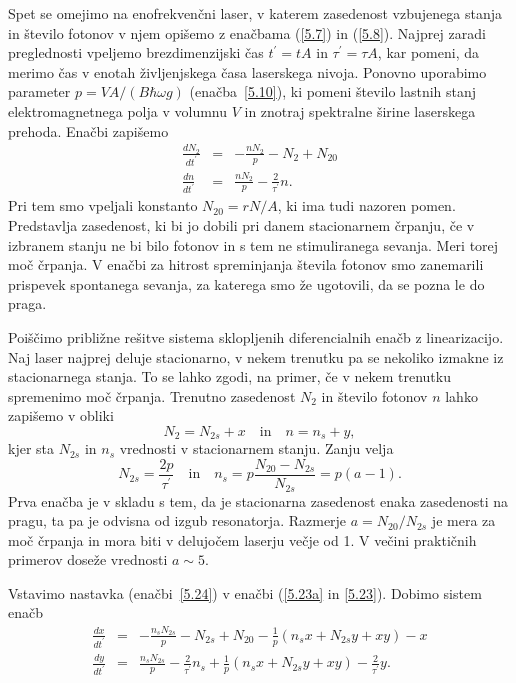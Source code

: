 Spet se omejimo na enofrekvenčni laser, v katerem zasedenost vzbujenega stanja
in število fotonov v njem opišemo z enačbama (\ref{5.7})
in (\ref{5.8}). Najprej zaradi preglednosti vpeljemo
brezdimenzijski čas $t^{\prime}=t A$ in $\tau^{\prime}=\tau A$, kar pomeni, da merimo 
čas v enotah življenjskega časa laserskega nivoja. Ponovno uporabimo parameter
$p=VA/(B\hbar\omega g)$ (enačba~\ref{5.10}), ki pomeni število lastnih stanj 
elektromagnetnega polja v volumnu $V$ in znotraj spektralne širine laserskega prehoda. 
Enačbi zapišemo 
\begin{eqnarray}  
\frac{d N_2}{d t^{\prime}}&=&-\frac{nN_2}{p}-N_2+N_{20} \label{5.23a} \\
\frac{d n}{d t^{\prime}}& = & \frac{nN_2}{p}-\frac{2}{\tau^{\prime}}n.
\label{5.23}
\end{eqnarray}
Pri tem smo vpeljali konstanto $N_{20}= rN/A$, ki ima tudi nazoren pomen.
Predstavlja zasedenost, ki bi jo dobili pri danem stacionarnem črpanju, če v
izbranem stanju ne bi bilo fotonov in s tem ne stimuliranega sevanja. Meri torej 
moč črpanja. V enačbi za hitrost spreminjanja števila fotonov
smo zanemarili prispevek spontanega sevanja, za katerega smo že ugotovili,
da se pozna le do praga.

Poiščimo približne rešitve sistema sklopljenih diferencialnih enačb z 
linearizacijo. Naj laser najprej deluje stacionarno, v nekem trenutku pa se 
nekoliko izmakne iz stacionarnega stanja. To se lahko zgodi, na primer, če v nekem 
trenutku spremenimo moč črpanja. Trenutno zasedenost $N_2$ in število fotonov $n$
lahko zapišemo v obliki 
\begin{equation}  
N_2= N_{2s}+x \quad \mathrm{in} \quad n=n_s+y,
\label{5.24}
\end{equation}
kjer sta $N_{2s}$ in $n_s$ vrednosti v stacionarnem stanju. Zanju velja 
\begin{equation}  
N_{2s}=\frac{2p}{\tau^{\prime}}\quad \mathrm{in}\quad  
n_s=p\frac{N_{20}-N_{2s}}{N_{2s}}=p(a-1).
\label{5.26}
\end{equation}
Prva enačba je v skladu s tem, da je stacionarna zasedenost 
enaka zasedenosti na pragu, ta pa je odvisna od izgub resonatorja. 
Razmerje $a=N_{20}/N_{2s}$ je mera za moč črpanja in
mora biti v delujočem laserju večje od 1. V večini praktičnih primerov
doseže vrednosti $a \sim 5$.

Vstavimo nastavka (enačbi~\ref{5.24}) v enačbi (\ref{5.23a} in \ref{5.23}). 
Dobimo sistem enačb
\begin{eqnarray}  
\frac{d x}{d t^{\prime}} &=&-\frac{n_sN_{2s}}{p}-N_{2s}+N_{20}- \frac{1}{p}
(n_sx+N_{2s}y+xy)-x \\
\frac{d y}{d t^{\prime}} &=& \frac{n_sN_{2s}}{p}-\frac{2}{\tau^{\prime}}n_s
+ \frac{1}{p}(n_s x+N_{2s} y+xy)-\frac{2}{\tau^{\prime}}y.
\label{5.27}
\end{eqnarray}

